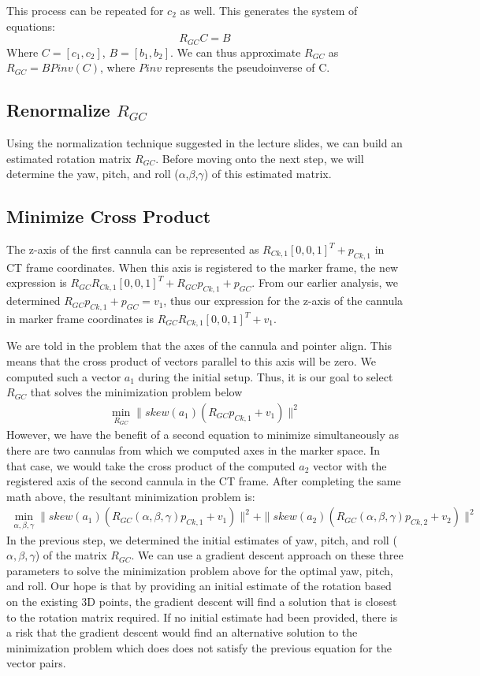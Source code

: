 \documentclass[letterpaper, 11pt]{article}
\begin{document}
This process can be repeated for $c_2$ as well. This generates the system of equations:
$$R_{GC}C = B$$
Where $C = [c_1, c_2]$, $B = [b_1, b_2]$. We can thus approximate $R_{GC}$ as $R_{GC} = BPinv(C)$, where $Pinv$ represents the pseudoinverse of C.

\subsection*{Renormalize $R_{GC}$}
Using the normalization technique suggested in the lecture slides, we can build an estimated rotation matrix $R_{GC}$. Before moving onto the next step, we will determine the yaw, pitch, and roll ($\alpha$,$\beta$,$\gamma$) of this estimated matrix.

\subsection*{Minimize Cross Product}
The z-axis of the first cannula can be represented as $R_{Ck,1}[0,0,1]^T + p_{Ck,1}$ in CT frame coordinates. When this axis is registered to the marker frame, the new expression is $R_{GC}R_{Ck,1}[0,0,1]^T + R_{GC}p_{Ck,1} + p_{GC}$. From our earlier analysis, we determined $R_{GC}p_{Ck,1} + p_{GC} = v_1$, thus our expression for the z-axis of the cannula in marker frame coordinates is $R_{GC}R_{Ck,1}[0,0,1]^T + v_1$.

We are told in the problem that the axes of the cannula and pointer align. This means that the cross product of vectors parallel to this axis will be zero. We computed such a vector $a_1$ during the initial setup. Thus, it is our goal to select $R_{GC}$ that solves the minimization problem below
\begin{align}
\min_{R_{GC}} \|skew(a_1)(R_{GC}p_{Ck,1} + v_1)\|^2
\end{align}
However, we have the benefit of a second equation to minimize simultaneously as there are two cannulas from which we computed axes in the marker space. In that case, we would take the cross product of the computed $a_2$ vector with the registered axis of the second cannula in the CT frame. After completing the same math above, the resultant minimization problem is:
\begin{align}
\min_{\alpha,\beta,\gamma} \|skew(a_1)(R_{GC}(\alpha,\beta,\gamma)p_{Ck,1} + v_1)\|^2 + \|skew(a_2)(R_{GC}(\alpha,\beta,\gamma)p_{Ck,2} + v_2)\|^2
\end{align}
In the previous step, we determined the initial estimates of yaw, pitch, and roll ($\alpha,\beta,\gamma$) of the matrix $R_{GC}$. We can use a gradient descent approach on these three parameters to solve the minimization problem above for the optimal yaw, pitch, and roll. Our hope is that by providing an initial estimate of the rotation based on the existing 3D points, the gradient descent will find a solution that is closest to the rotation matrix required. If no initial estimate had been provided, there is a risk that the gradient descent would find an alternative solution to the minimization problem which does does not satisfy the previous equation for the vector pairs.
\end{document}
